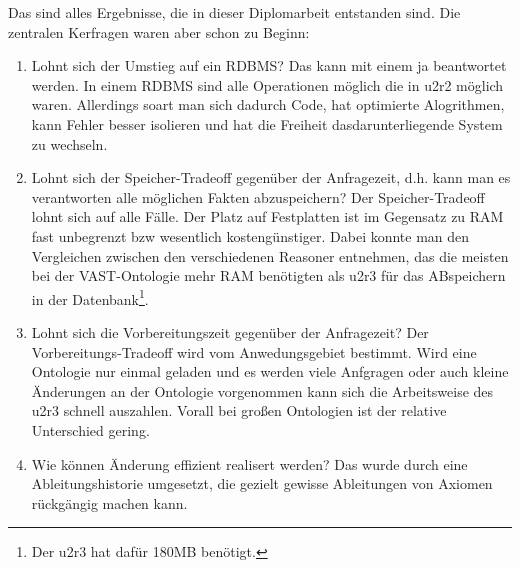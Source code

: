 Das sind alles Ergebnisse, die in dieser Diplomarbeit entstanden sind. Die zentralen Kerfragen waren aber schon zu Beginn:
\begin{enumerate}
  \item Lohnt sich der Umstieg auf ein RDBMS? Das kann mit einem ja beantwortet werden. In einem RDBMS sind alle Operationen möglich die in u2r2 möglich waren. Allerdings soart man sich dadurch Code, hat optimierte Alogrithmen, kann Fehler besser isolieren und hat die Freiheit dasdarunterliegende System zu wechseln.
  \item Lohnt sich der Speicher-Tradeoff gegenüber der Anfragezeit, d.h. kann man es verantworten alle möglichen Fakten abzuspeichern? Der Speicher-Tradeoff lohnt sich auf alle Fälle. Der Platz auf Festplatten ist im Gegensatz zu RAM fast unbegrenzt bzw wesentlich kostengünstiger. Dabei konnte man den Vergleichen zwischen den verschiedenen Reasoner entnehmen, das die meisten bei der VAST-Ontologie mehr RAM benötigten als u2r3 für das ABspeichern in der Datenbank\footnote{Der u2r3 hat dafür 180MB benötigt.}.
  \item Lohnt sich die Vorbereitungszeit gegenüber der Anfragezeit? Der Vorbereitungs-Tradeoff wird vom Anwedungsgebiet bestimmt. Wird eine Ontologie nur einmal geladen und es werden viele Anfgragen oder auch kleine Änderungen an der Ontologie vorgenommen kann sich die Arbeitsweise des u2r3 schnell auszahlen. Vorall bei großen Ontologien ist der relative Unterschied gering.
  \item Wie können Änderung effizient realisert werden? Das wurde durch eine Ableitungshistorie umgesetzt, die gezielt gewisse Ableitungen von Axiomen rückgängig machen kann.
\end{enumerate}
